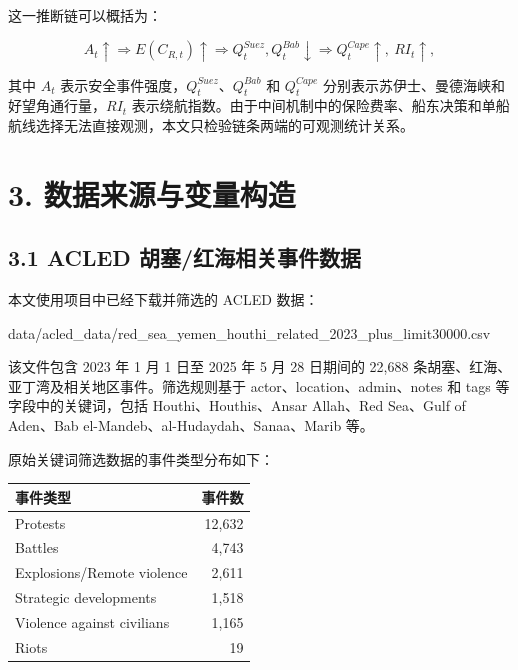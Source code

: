 \documentclass[
]{ctexart}
\newenvironment{Shaded}{}{}
\newcommand{\NormalTok}[1]{#1}
\begin{document}
这一推断链可以概括为：

\[
A_t \uparrow
\Rightarrow E(C_{R,t}) \uparrow
\Rightarrow Q^{Suez}_t,Q^{Bab}_t \downarrow
\Rightarrow Q^{Cape}_t \uparrow,\ RI_t \uparrow,
\]

其中 \(A_t\) 表示安全事件强度，\(Q^{Suez}_t\)、\(Q^{Bab}_t\) 和
\(Q^{Cape}_t\) 分别表示苏伊士、曼德海峡和好望角通行量，\(RI_t\)
表示绕航指数。由于中间机制中的保险费率、船东决策和单船航线选择无法直接观测，本文只检验链条两端的可观测统计关系。

\section{3.
数据来源与变量构造}\label{ux6570ux636eux6765ux6e90ux4e0eux53d8ux91cfux6784ux9020}

\subsection{3.1 ACLED
胡塞/红海相关事件数据}\label{acled-ux80e1ux585eux7ea2ux6d77ux76f8ux5173ux4e8bux4ef6ux6570ux636e}

本文使用项目中已经下载并筛选的 ACLED 数据：

\begin{Shaded}
\begin{Highlighting}[]
\NormalTok{data/acled\_data/red\_sea\_yemen\_houthi\_related\_2023\_plus\_limit30000.csv}
\end{Highlighting}
\end{Shaded}

该文件包含 2023 年 1 月 1 日至 2025 年 5 月 28 日期间的 22,688
条胡塞、红海、亚丁湾及相关地区事件。筛选规则基于
actor、location、admin、notes 和 tags 等字段中的关键词，包括
Houthi、Houthis、Ansar Allah、Red Sea、Gulf of Aden、Bab
el-Mandeb、al-Hudaydah、Sanaa、Marib 等。

原始关键词筛选数据的事件类型分布如下：

\begin{longtable}[]{@{}lr@{}}
\toprule\noalign{}
事件类型 & 事件数 \\
\midrule\noalign{}
\endhead
\bottomrule\noalign{}
\endlastfoot
Protests & 12,632 \\
Battles & 4,743 \\
Explosions/Remote violence & 2,611 \\
Strategic developments & 1,518 \\
Violence against civilians & 1,165 \\
Riots & 19 \\
\end{longtable}
\end{document}
